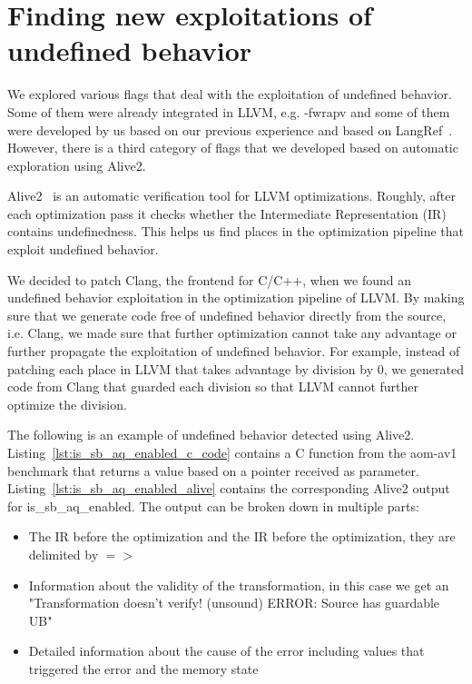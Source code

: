 \section{Finding new exploitations of undefined behavior}

We explored various flags that deal with the exploitation of undefined behavior.
Some of them were already integrated in LLVM, e.g. -fwrapv and some of them were
developed by us based on our previous experience and based on
LangRef~\cite{langref}. However, there is a third category of flags that we
developed based on automatic exploration using Alive2.

Alive2~\cite{lopes2021alive2} is an automatic verification tool for LLVM
optimizations. Roughly, after each optimization pass it checks whether the
Intermediate Representation (IR) contains undefinedness. This helps us find
places in the optimization pipeline that exploit undefined behavior.

We decided to patch Clang, the frontend for C/C++, when we found an undefined
behavior exploitation in the optimization pipeline of LLVM. By making sure that
we generate code free of undefined behavior directly from the source, i.e.
Clang, we made sure that further optimization cannot take any advantage or
further propagate the exploitation of undefined behavior. For example, instead
of patching each place in LLVM that takes advantage by division by 0, we
generated code from Clang that guarded each division so that LLVM cannot further
optimize the division.


The following is an example of undefined behavior detected using Alive2.
Listing~\ref{lst:is_sb_aq_enabled_c_code} contains a C function from the
aom-av1~\cite{aomav1benchmark} benchmark that returns a value based on a pointer
received as parameter. Listing~\ref{lst:is_sb_aq_enabled_alive} contains the
corresponding Alive2 output for is_sb_aq_enabled. The output can be broken down
in multiple parts:

\begin{itemize}
  \item The IR before the optimization and the IR before the optimization, they
are delimited by \(=>\)
  \item Information about the validity of the transformation, in this case we
get an "Transformation doesn't verify! (unsound) ERROR: Source has guardable UB"
  \item Detailed information about the cause of the error including values that
triggered the error and the memory state
\end{itemize}

